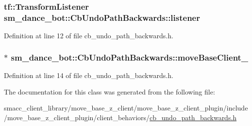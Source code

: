 \subsubsection[{\texorpdfstring{listener}{listener}}]{\setlength{\rightskip}{0pt plus 5cm}tf\+::\+Transform\+Listener sm\+\_\+dance\+\_\+bot\+::\+Cb\+Undo\+Path\+Backwards\+::listener\hspace{0.3cm}{\ttfamily [private]}}\hypertarget{classsm__dance__bot_1_1CbUndoPathBackwards_a35aa53997f49c33d11a43cca81a72dfd}{}\label{classsm__dance__bot_1_1CbUndoPathBackwards_a35aa53997f49c33d11a43cca81a72dfd}


Definition at line 12 of file cb\+\_\+undo\+\_\+path\+\_\+backwards.\+h.

\subsubsection[{\texorpdfstring{move\+Base\+Client\+\_\+}{moveBaseClient_}}]{$\ast$ sm\+\_\+dance\+\_\+bot\+::\+Cb\+Undo\+Path\+Backwards\+::move\+Base\+Client\+\_\+\hspace{0.3cm}{\ttfamily [private]}}\hypertarget{classsm__dance__bot_1_1CbUndoPathBackwards_af79da57bfb5ecd6b20af32e44d4b9ca9}{}\label{classsm__dance__bot_1_1CbUndoPathBackwards_af79da57bfb5ecd6b20af32e44d4b9ca9}


Definition at line 14 of file cb\+\_\+undo\+\_\+path\+\_\+backwards.\+h.



The documentation for this class was generated from the following file\+:\begin{DoxyCompactItemize}
\item 
smacc\+\_\+client\+\_\+library/move\+\_\+base\+\_\+z\+\_\+client/move\+\_\+base\+\_\+z\+\_\+client\+\_\+plugin/include/move\+\_\+base\+\_\+z\+\_\+client\+\_\+plugin/client\+\_\+behaviors/\hyperlink{smacc__client__library_2move__base__z__client_2move__base__z__client__plugin_2include_2move__bascbc9ae7d3990516ddb2c98e15a09bcd2}{cb\+\_\+undo\+\_\+path\+\_\+backwards.\+h}\end{DoxyCompactItemize}

